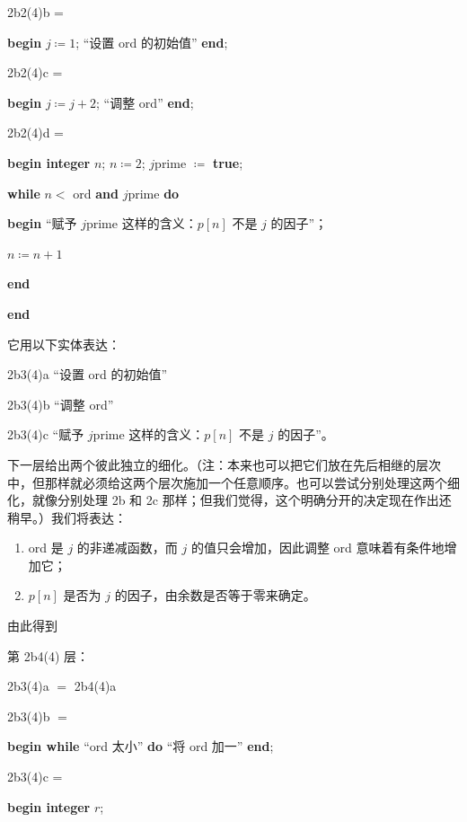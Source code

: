 \documentclass[twoside,11pt,fontset=none]{ctexbook}
\begin{document}
\noindent
2b2(4)b =

\noindent
\textbf{begin} $j \coloneq 1$; “设置 ord 的初始值” \textbf{end};

\noindent
2b2(4)c =

\noindent
\textbf{begin} $j \coloneq j + 2$; “调整 ord” \textbf{end};

\noindent
2b2(4)d =

\noindent
\textbf{begin integer} $n$; $n \coloneq 2$; $j$prime $\coloneq$ \textbf{true};

\noindent
\quad\textbf{while} $n <$ ord \textbf{and} $j$prime \textbf{do}

\noindent
\quad\quad\textbf{begin} “赋予 $j$prime 这样的含义：$p[n]$ 不是 $j$ 的因子”；

\noindent
\quad\quad\quad $n \coloneq n + 1$

\noindent
\quad\textbf{end}

\noindent
\textbf{end}

\noindent
它用以下实体表达：

\noindent
2b3(4)a\tabto{5em} “设置 ord 的初始值”

\noindent
2b3(4)b\tabto{5em} “调整 ord”

\noindent
2b3(4)c\tabto{5em} “赋予 $j$prime 这样的含义：$p[n]$ 不是 $j$ 的因子”。

下一层给出两个彼此独立的细化。（注：本来也可以把它们放在先后相继的层次中，但那样就必须给这两个层次施加一个任意顺序。也可以尝试分别处理这两个细化，就像分别处理 2b 和 2c 那样；但我们觉得，这个明确分开的决定现在作出还稍早。）我们将表达：

\begin{enumerate}[leftmargin=2\parindent, label=(\arabic*)]
	\item ord 是 $j$ 的非递减函数，而 $j$ 的值只会增加，因此调整 ord 意味着有条件地增加它；

	\item $p[n]$ 是否为 $j$ 的因子，由余数是否等于零来确定。
\end{enumerate}

\noindent
由此得到

\noindent
第 2b4(4) 层：

\noindent
2b3(4)a $=$ 2b4(4)a

\noindent
2b3(4)b $=$

\noindent
\textbf{begin while} “ord 太小” \textbf{do} “将 ord 加一” \textbf{end};

\noindent
2b3(4)c =

\noindent
\textbf{begin integer} $r$;
\end{document}
